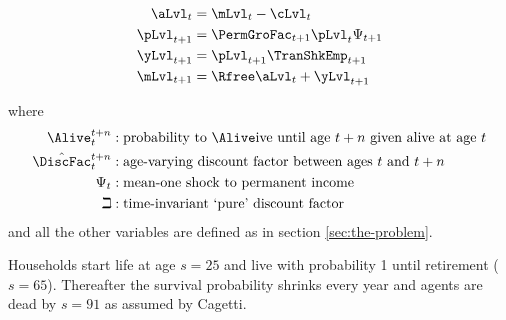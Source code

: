 \documentclass[titlepage, headings=optiontotocandhead]{Resources/texmf-local/tex/latex/econtex}
\begin{document}
  \begin{equation*}\begin{gathered}\begin{aligned}
        \aLvl_{t}  & = \mLvl_{t}-\cLvl_{t}
        \\      \pLvl_{t+1}  & = \PermGroFac_{t+1}\pLvl_{t}\Psi_{t+1}
        \\      \yLvl_{t+1}  & = \pLvl_{t+1}\TranShkEmp _{t+1}
        \\      \mLvl_{t+1}  & = \Rfree \aLvl_{t}+\yLvl_{t+1}
      \end{aligned}\end{gathered}\end{equation*}

where
  \begin{equation*}\begin{gathered}\begin{aligned}
        \Alive _{t}^{t+n} &:\text{probability to }\Alive\text{ive until age $t+n$ given alive at age $t$}
        \\      \hat{\DiscFac}_{t}^{t+n} &:\text{age-varying discount factor between ages $t$ and $t+n$}
        \\     \Psi_{t} &:\text{mean-one shock to permanent income}
        \\     \beth &:\text{time-invariant `pure' discount factor}
      \end{aligned}\end{gathered}\end{equation*}
and all the other variables are defined as in section \ref{sec:the-problem}.

Households start life at age $s=25$ and live with probability 1 until retirement
($s=65$). Thereafter the survival probability shrinks every year and
agents are dead by $s=91$ as assumed by Cagetti. %
\end{document}
